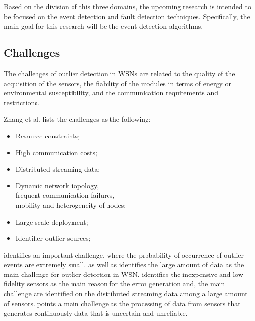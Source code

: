 Based on the division of this three domains, the upcoming research is intended to be focused on the event detection and fault detection techniques. Specifically, the main goal for this research will be the event detection algorithms.


\subsection{Challenges}

The challenges of outlier detection in WSNs are related to the quality of the acquisition of the sensors, the fiability of the modules in terms of energy or environmental susceptibility, and the communication requirements and restrictions.

Zhang et al. \cite{gen:zhang:2010} lists the challenges as the following:

\begin{itemize}
	\setlength\itemsep{-0.5em}
	
	\item Resource constraints;
	
	\item High communication costs;
	
	\item Distributed streaming data;
	
	\item Dynamic network topology, \\ frequent communication failures, \\ mobility and heterogeneity of nodes;
	
	\item Large-scale deployment;
	
	\item Identifier outlier sources;
	
\end{itemize}

\cite{class:branch:2006} identifies an important challenge, where the probability of occurrence of outlier events are extremely small. \cite{nn:abid:2016} as well as \cite{stat:sheng:2007} identifies the large amount of data as the main challenge for outlier detection in WSN. \cite{nn:zhuang:2006} identifies the inexpensive and low fidelity sensors as the main reason for the error generation and, the main challenge are identified on the distributed streaming data among a large amount of sensors. \cite{stat:ghorbel:2015} points a main challenge as the processing of data from sensors that generates continuously data that is uncertain and unreliable. 

